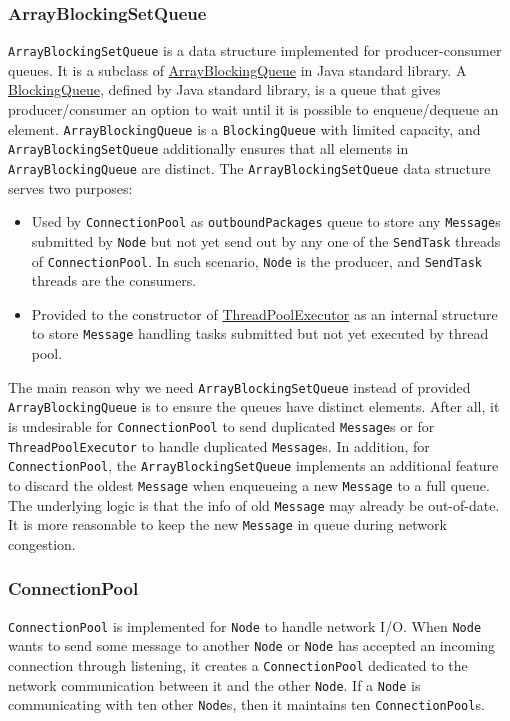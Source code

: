 \documentclass{article}
\numberwithin{equation}{section}
\begin{document}
\subsubsection{ArrayBlockingSetQueue}
\verb|ArrayBlockingSetQueue| is a data structure implemented for producer-consumer queues. It is a subclass of \href{https://docs.oracle.com/javase/8/docs/api/java/util/concurrent/ArrayBlockingQueue.html}{ArrayBlockingQueue} in Java standard library. A \href{https://docs.oracle.com/javase/8/docs/api/java/util/concurrent/BlockingQueue.html}{BlockingQueue}, defined by Java standard library, is a queue that gives producer/consumer an option to wait until it is possible to enqueue/dequeue an element. \verb|ArrayBlockingQueue| is a \verb|BlockingQueue| with limited capacity, and \verb|ArrayBlockingSetQueue| additionally ensures that all elements in \verb|ArrayBlockingQueue| are distinct. The \verb|ArrayBlockingSetQueue| data structure serves two purposes:
\begin{itemize}
	\item Used by \verb|ConnectionPool| as \verb|outboundPackages| queue to store any \verb|Message|s submitted by \verb|Node| but not yet send out by any one of the \verb|SendTask| threads of \verb|ConnectionPool|. In such scenario, \verb|Node| is the producer, and \verb|SendTask| threads are the consumers.
	\item Provided to the constructor of \href{https://docs.oracle.com/javase/8/docs/api/java/util/concurrent/ThreadPoolExecutor.html}{ThreadPoolExecutor} as an internal structure to store \verb|Message| handling tasks submitted but not yet executed by thread pool.
\end{itemize}
The main reason why we need \verb|ArrayBlockingSetQueue| instead of provided \verb|ArrayBlockingQueue| is to ensure the queues have distinct elements. After all, it is undesirable for \verb|ConnectionPool| to send duplicated \verb|Message|s or for \verb|ThreadPoolExecutor| to handle duplicated \verb|Message|s. In addition, for \verb|ConnectionPool|, the \verb|ArrayBlockingSetQueue| implements an additional feature to discard the oldest \verb|Message| when enqueueing a new \verb|Message| to a full queue. The underlying logic is that the info of old \verb|Message| may already be out-of-date. It is more reasonable to keep the new \verb|Message| in queue during network congestion.

\subsubsection{ConnectionPool}
\verb|ConnectionPool| is implemented for \verb|Node| to handle network I/O. When \verb|Node| wants to send some message to another \verb|Node| or \verb|Node| has accepted an incoming connection through listening, it creates a \verb|ConnectionPool| dedicated to the network communication between it and the other \verb|Node|. If a \verb|Node| is communicating with ten other \verb|Node|s, then it maintains ten \verb|ConnectionPool|s.\\
\end{document}
